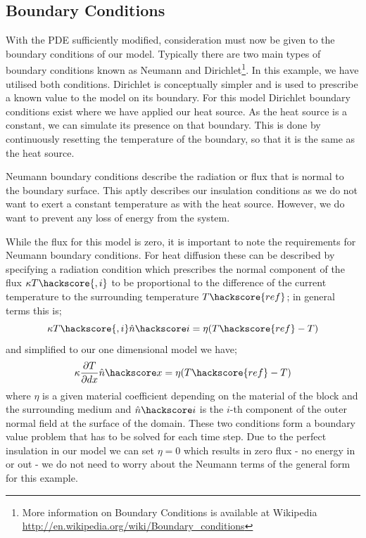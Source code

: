 \subsection{Boundary Conditions}
With the PDE sufficiently modified, consideration must now be given to the boundary conditions of our model. Typically there are two main types of boundary conditions known as Neumann and Dirichlet\footnote{More information on Boundary Conditions is available at Wikipedia \url{http://en.wikipedia.org/wiki/Boundary_conditions}}. In this example, we have utilised both conditions. Dirichlet is conceptually simpler and is used to prescribe a known value to the model on its boundary. For this model Dirichlet boundary conditions exist where we have applied our heat source. As the heat source is a constant, we can simulate its presence on that boundary. This is done by continuously resetting the temperature of the boundary, so that it is the same as the heat source.  

Neumann boundary conditions describe the radiation or flux that is normal to the boundary surface. This aptly describes our insulation conditions as we do not want to exert a constant temperature as with the heat source. However, we do want to prevent any loss of energy from the system. 

While the flux for this model is zero, it is important to note the requirements for Neumann boundary conditions. For heat diffusion these can be described by specifying a radiation condition which prescribes the normal component of the flux $\kappa T\hackscore{,i}$ to be proportional
to the difference of the current temperature to the surrounding temperature $T\hackscore{ref}$; in general terms this is;
\begin{equation}
 \kappa T\hackscore{,i} \hat{n}\hackscore i = \eta (T\hackscore{ref}-T) 
\label{eqn:hdbc}
\end{equation}
and simplified to our one dimensional model we have;
\begin{equation}
\kappa \frac{\partial T}{\partial dx} \hat{n}\hackscore x = \eta (T\hackscore{ref}-T) 
\end{equation}
where $\eta$ is a given material coefficient depending on the material of the block and the surrounding medium and $\hat{n}\hackscore i$ is the $i$-th component of the outer normal field  at the surface of the domain. These two conditions form a boundary value problem that has to be solved for each time step. Due to the perfect insulation in our model we can set $\eta = 0$ which results in zero flux - no energy in or out - we do not need to worry about the Neumann terms of the general form for this example.

